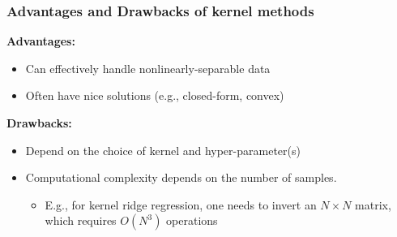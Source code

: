 \subsubsection{Advantages and Drawbacks of kernel methods}
\textbf{Advantages:} 
\begin{itemize}
  \item Can effectively handle nonlinearly-separable data
  \item Often have nice solutions (e.g., closed-form, convex)
\end{itemize}

\textbf{Drawbacks:}
\begin{itemize}
  \item Depend on the choice of kernel and hyper-parameter(s)
  \item Computational complexity depends on the number of samples. 
  \begin{itemize}
    \item E.g., for kernel ridge regression, one needs to invert an $N \times N$ matrix, which
requires $O(N^3)$ operations
  \end{itemize}
\end{itemize}
